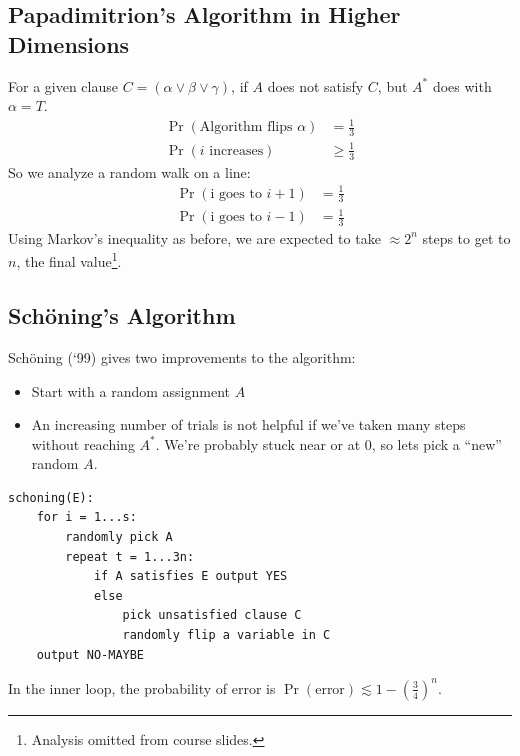                 \subsection{Papadimitrion's Algorithm in Higher Dimensions} %
                \label{sub:papadimitrion_s_algorithm_in_higher_dimensions}
                    For a given clause $C = (\alpha \lor \beta \lor \gamma)$, if $A$ does not satisfy $C$, but $A^*$ does with $\alpha = T$.
                    \begin{align*}
                        \Pr(\text{Algorithm flips $\alpha$}) &= \frac{1}{3} \\
                        \Pr(\text{$i$ increases}) &\ge \frac{1}{3}
                    \end{align*}
                    So we analyze a random walk on a line:
                    \begin{align*}
                        \Pr(\text{i goes to $i+1$}) &= \frac{1}{3} \\
                        \Pr(\text{i goes to $i-1$}) &= \frac{1}{3}
                    \end{align*}
                    Using Markov's inequality as before, we are expected to take $\approx 2^n$ steps to get to $n$, the final value\footnote{Analysis omitted from course slides.}.
                \subsection{Sch\"{o}ning's Algorithm} %
                \label{sub:sch_ning_s_algorithm}
                    Sch\"{o}ning (`99) gives two improvements to the algorithm:
                    \begin{itemize}
                        \item Start with a random assignment $A$
                        \item An increasing number of trials is not helpful if we've taken many steps without reaching $A^*$.
                        We're probably stuck near or at $0$, so lets pick a ``new'' random $A$.
                    \end{itemize}
                    \begin{verbatim}
schoning(E):
    for i = 1...s:
        randomly pick A
        repeat t = 1...3n:
            if A satisfies E output YES
            else
                pick unsatisfied clause C
                randomly flip a variable in C
    output NO-MAYBE
                    \end{verbatim}
                    In the inner loop, the probability of error is $\Pr(\text{error}) \lesssim 1 - \left( \frac{3}{4} \right)^n$.

